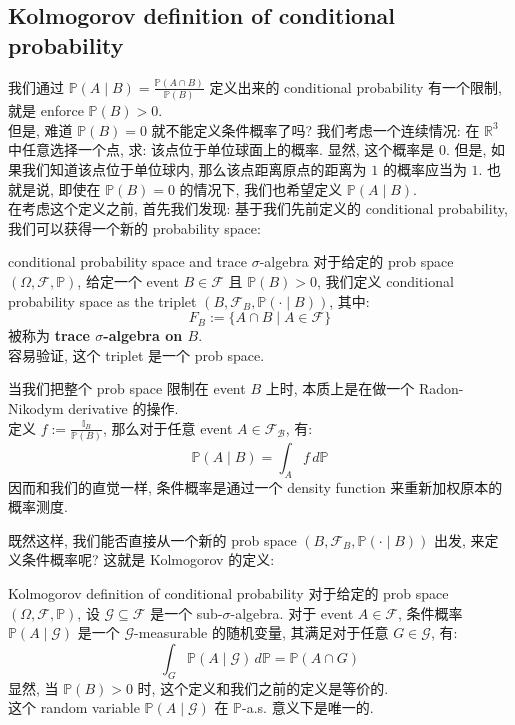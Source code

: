\subsection{Kolmogorov definition of conditional probability}
我们通过 \(\mathbb{P}(A \mid B) = \frac{\mathbb{P}(A \cap B)}{\mathbb{P}(B)}\) 定义出来的 conditional probability 有一个限制, 就是 enforce \(\mathbb{P}(B) > 0\). \\
但是, 难道 \(\mathbb{P}(B) = 0\) 就不能定义条件概率了吗? 我们考虑一个连续情况: 在 \(\mathbb{R}^3\) 中任意选择一个点, 求: 该点位于单位球面上的概率. 显然, 这个概率是 0. 但是, 如果我们知道该点位于单位球内, 那么该点距离原点的距离为 \(1\) 的概率应当为 \(1\). 也就是说,  即使在 \(\mathbb{P}(B) = 0\) 的情况下, 我们也希望定义 \(\mathbb{P}(A \mid B)\).\\
在考虑这个定义之前, 首先我们发现: 基于我们先前定义的 conditional probability, 我们可以获得一个新的 probability space:
\begin{definition}{conditional probability space and trace $\sigma$-algebra}
    对于给定的 prob space \((\Omega, \mathcal{F}, \mathbb{P})\), 给定一个 event \(B \in \mathcal{F}\) 且 \(\mathbb{P}(B) > 0\), 我们定义 conditional probability space as the triplet \((B, \mathcal{F}_B, \mathbb{P}(\cdot \mid B))\), 其中:
    \[
    F_B := \{A\cap B \mid  A \in \mathcal{F} \}
    \]
    被称为 \textbf{trace \(\sigma\)-algebra on \(B\)}.\\
    容易验证, 这个 triplet 是一个 prob space.
\end{definition}
\begin{remark}
    当我们把整个 prob space 限制在 event \(B\) 上时, 本质上是在做一个 Radon-Nikodym derivative 的操作.\\
    定义 \(f:= \frac{\mathbb{I}_B}{\mathbb{P}(B)}\), 那么对于任意 event \(A \in \mathcal{F_B}\), 有:
    \[
    \mathbb{P}(A \mid B) = \int_{A} f \, d\mathbb{P}
    \] 
    因而和我们的直觉一样, 条件概率是通过一个 density function 来重新加权原本的概率测度. 
\end{remark}
既然这样, 我们能否直接从一个新的 prob space \((B, \mathcal{F}_B, \mathbb{P}(\cdot \mid B))\) 出发, 来定义条件概率呢? 这就是 Kolmogorov 的定义:
\begin{definition}{Kolmogorov definition of conditional probability}
    对于给定的 prob space \((\Omega, \mathcal{F}, \mathbb{P})\), 
    设 \(\mathcal{G} \subseteq \mathcal{F}\) 是一个 sub-\(\sigma\)-algebra. 对于 event \(A \in \mathcal{F}\), 条件概率 \(\mathbb{P}(A \mid \mathcal{G})\) 是一个 \(\mathcal{G}\)-measurable 的随机变量, 其满足对于任意 \(G \in \mathcal{G}\), 有:
    \[
    \int_G \mathbb{P} (A \mid \mathcal{G}) \, d\mathbb{P} = \mathbb{P}(A \cap G)
    \]
    显然, 当 \(\mathbb{P}(B) > 0\) 时, 这个定义和我们之前的定义是等价的.\\
    这个 random variable \(\mathbb{P}(A \mid \mathcal{G})\) 在 \(\mathbb{P}\)-a.s. 意义下是唯一的.
\end{definition}
